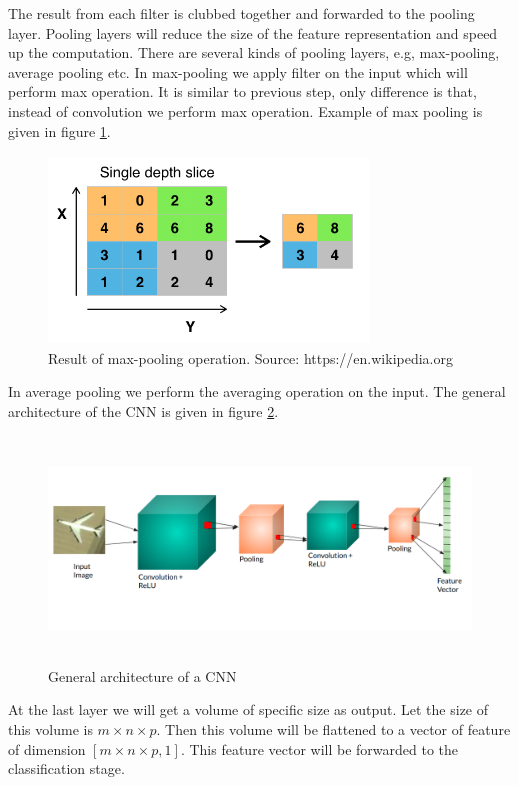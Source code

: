 \par The result from each filter is clubbed together and forwarded to the pooling layer. Pooling layers will reduce the size of the feature representation and speed up the computation. There are several kinds of pooling layers, e.g, max-pooling, average pooling etc. In max-pooling we apply filter on the input which will perform max operation. It is similar to previous step, only difference is that, instead of convolution we perform max operation. Example of max pooling is given in figure \ref{fig7}. 

\begin{figure}[!htbp]
\centerline{\includegraphics[height=50mm,width=85mm]{img/fig7.png}}
\caption{Result of max-pooling operation. Source: https://en.wikipedia.org}
\label{fig7}
\end{figure}

In average pooling we perform the averaging operation on the input. The general architecture of the CNN is given in figure \ref{fig8}.

\begin{figure}[!htbp]
\centerline{\includegraphics[height=60mm,width=150mm]{img/fig8.png}}
\caption{General architecture of a CNN}
\label{fig8}
\end{figure}

At the last layer we will get a volume of specific size as output. Let the size of this volume is $m\times n\times p$. Then this volume will be flattened to a vector of feature of dimension $[m\times n\times p, 1]$. This feature vector will be forwarded to the classification stage.

